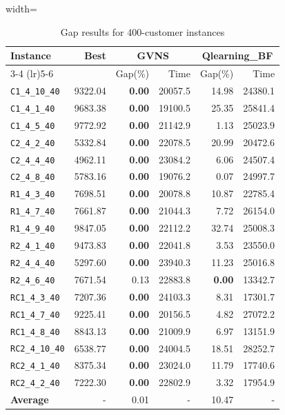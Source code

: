\begin{table}[ht]
\centering
\small
\setlength{\tabcolsep}{5pt}
\caption{Gap results for 400-customer instances}
\vspace{4mm}
\begin{adjustbox}{width=\textwidth}
\begin{tabular}{l r r r @{\hspace{8pt}} r r @{\hspace{8pt}}}
\toprule
\multirow{2}{*}{Instance} & \multirow{2}{*}{Best} & \multicolumn{2}{c}{GVNS} & \multicolumn{2}{c}{Qlearning\_BF} \\
\cmidrule(lr){3-4} \cmidrule(lr){5-6}
 &  & Gap(\%) & Time & Gap(\%) & Time \\
\midrule
\texttt{C1\_4\_10\_40} & 9322.04 & \textbf{0.00} & 20057.5 & 14.98 & 24380.1 \\
\texttt{C1\_4\_1\_40} & 9683.38 & \textbf{0.00} & 19100.5 & 25.35 & 25841.4 \\
\texttt{C1\_4\_5\_40} & 9772.92 & \textbf{0.00} & 21142.9 & 1.13 & 25023.9 \\
\texttt{C2\_4\_2\_40} & 5332.84 & \textbf{0.00} & 22078.5 & 20.99 & 20472.6 \\
\texttt{C2\_4\_4\_40} & 4962.11 & \textbf{0.00} & 23084.2 & 6.06 & 24507.4 \\
\texttt{C2\_4\_8\_40} & 5783.16 & \textbf{0.00} & 19076.2 & 0.07 & 24997.7 \\
\texttt{R1\_4\_3\_40} & 7698.51 & \textbf{0.00} & 20078.8 & 10.87 & 22785.4 \\
\texttt{R1\_4\_7\_40} & 7661.87 & \textbf{0.00} & 21044.3 & 7.72 & 26154.0 \\
\texttt{R1\_4\_9\_40} & 9847.05 & \textbf{0.00} & 22112.2 & 32.74 & 25008.3 \\
\texttt{R2\_4\_1\_40} & 9473.83 & \textbf{0.00} & 22041.8 & 3.53 & 23550.0 \\
\texttt{R2\_4\_4\_40} & 5297.60 & \textbf{0.00} & 23940.3 & 11.23 & 25016.8 \\
\texttt{R2\_4\_6\_40} & 7671.54 & 0.13 & 22883.8 & \textbf{0.00} & 13342.7 \\
\texttt{RC1\_4\_3\_40} & 7207.36 & \textbf{0.00} & 24103.3 & 8.31 & 17301.7 \\
\texttt{RC1\_4\_7\_40} & 9225.41 & \textbf{0.00} & 20156.5 & 4.82 & 27072.2 \\
\texttt{RC1\_4\_8\_40} & 8843.13 & \textbf{0.00} & 21009.9 & 6.97 & 13151.9 \\
\texttt{RC2\_4\_10\_40} & 6538.77 & \textbf{0.00} & 24004.5 & 18.51 & 28252.7 \\
\texttt{RC2\_4\_1\_40} & 8375.34 & \textbf{0.00} & 23024.0 & 11.79 & 17740.6 \\
\texttt{RC2\_4\_2\_40} & 7222.30 & \textbf{0.00} & 22802.9 & 3.32 & 17954.9 \\
\midrule
\textbf{Average} & - & 0.01 & - & 10.47 & - \\
\bottomrule
\end{tabular}
\end{adjustbox}
\end{table}